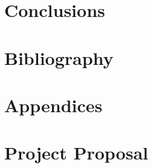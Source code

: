 \documentclass[12pt,twoside,notitlepage]{report}
\begin{document}
\chapter{Conclusions}
\label{chap:conclusions}

\chapter{Bibliography}
\label{chap:bibliography}


\chapter{Appendices}
\label{chap:appendices}

\chapter{Project Proposal}
\label{chap:proposal}

\end{document}

